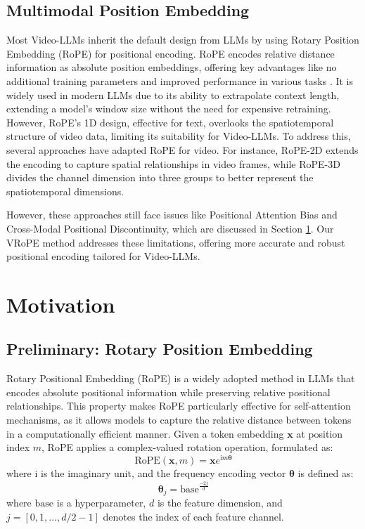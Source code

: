 \documentclass[11pt]{article}
\newcommand{\methodname}{VRoPE\xspace}
\newcommand{\imageunit}{\mathrm{i}}
\begin{document}
\subsection{Multimodal Position Embedding}
Most Video-LLMs inherit the default design from LLMs by using Rotary Position Embedding (RoPE) \cite{su2024roformer} for positional encoding. RoPE encodes relative distance information as absolute position embeddings, offering key advantages like no additional training parameters and improved performance in various tasks \cite{su2024roformer}. It is widely used in modern LLMs due to its ability to extrapolate context length, extending a model's window size without the need for expensive retraining. However, RoPE's 1D design, effective for text, overlooks the spatiotemporal structure of video data, limiting its suitability for Video-LLMs. To address this, several approaches have adapted RoPE for video. For instance, RoPE-2D \cite{agrawal2024pixtral, wang2024qwen2} extends the encoding to capture spatial relationships in video frames, while RoPE-3D \cite{wang2024qwen2, bai2025qwen2} divides the channel dimension into three groups to better represent the spatiotemporal dimensions.

However, these approaches still face issues like Positional Attention Bias and Cross-Modal Positional Discontinuity, which are discussed in Section \ref{sec:motivation}. Our \methodname method addresses these limitations, offering more accurate and robust positional encoding tailored for Video-LLMs.

\section{Motivation}
\label{sec:motivation}

\subsection{Preliminary: Rotary Position Embedding}
Rotary Positional Embedding (RoPE) is a widely adopted method in LLMs that encodes absolute positional information while preserving relative positional relationships. This property makes RoPE particularly effective for self-attention mechanisms, as it allows models to capture the relative distance between tokens in a computationally efficient manner.  
Given a token embedding $\mathbf{x}$ at position index $m$, RoPE applies a complex-valued rotation operation, formulated as:  
\begin{equation}
\text{RoPE}(\mathbf{x}, m) = \mathbf{x} e^{\imageunit m \boldsymbol{\theta}}
\end{equation}
\noindent where $\imageunit$ is the imaginary unit, and the frequency encoding vector $\boldsymbol{\theta}$ is defined as:
\begin{equation}
\boldsymbol{\theta}_j = \text{base}^{\frac{-2j}{d}}
\end{equation}
\noindent where $\text{base}$ is a hyperparameter, $d$ is the feature dimension, and $j = [0, 1,..., d/2 - 1] $ denotes the index of each feature channel.  
\end{document}

